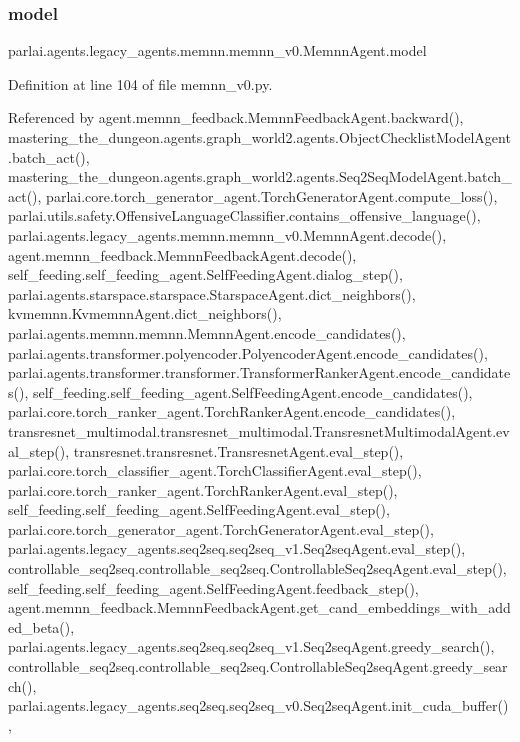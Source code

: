 \subsubsection{\texorpdfstring{model}{model}}
{\footnotesize\ttfamily parlai.\+agents.\+legacy\+\_\+agents.\+memnn.\+memnn\+\_\+v0.\+Memnn\+Agent.\+model}



Definition at line 104 of file memnn\+\_\+v0.\+py.



Referenced by agent.\+memnn\+\_\+feedback.\+Memnn\+Feedback\+Agent.\+backward(), mastering\+\_\+the\+\_\+dungeon.\+agents.\+graph\+\_\+world2.\+agents.\+Object\+Checklist\+Model\+Agent.\+batch\+\_\+act(), mastering\+\_\+the\+\_\+dungeon.\+agents.\+graph\+\_\+world2.\+agents.\+Seq2\+Seq\+Model\+Agent.\+batch\+\_\+act(), parlai.\+core.\+torch\+\_\+generator\+\_\+agent.\+Torch\+Generator\+Agent.\+compute\+\_\+loss(), parlai.\+utils.\+safety.\+Offensive\+Language\+Classifier.\+contains\+\_\+offensive\+\_\+language(), parlai.\+agents.\+legacy\+\_\+agents.\+memnn.\+memnn\+\_\+v0.\+Memnn\+Agent.\+decode(), agent.\+memnn\+\_\+feedback.\+Memnn\+Feedback\+Agent.\+decode(), self\+\_\+feeding.\+self\+\_\+feeding\+\_\+agent.\+Self\+Feeding\+Agent.\+dialog\+\_\+step(), parlai.\+agents.\+starspace.\+starspace.\+Starspace\+Agent.\+dict\+\_\+neighbors(), kvmemnn.\+Kvmemnn\+Agent.\+dict\+\_\+neighbors(), parlai.\+agents.\+memnn.\+memnn.\+Memnn\+Agent.\+encode\+\_\+candidates(), parlai.\+agents.\+transformer.\+polyencoder.\+Polyencoder\+Agent.\+encode\+\_\+candidates(), parlai.\+agents.\+transformer.\+transformer.\+Transformer\+Ranker\+Agent.\+encode\+\_\+candidates(), self\+\_\+feeding.\+self\+\_\+feeding\+\_\+agent.\+Self\+Feeding\+Agent.\+encode\+\_\+candidates(), parlai.\+core.\+torch\+\_\+ranker\+\_\+agent.\+Torch\+Ranker\+Agent.\+encode\+\_\+candidates(), transresnet\+\_\+multimodal.\+transresnet\+\_\+multimodal.\+Transresnet\+Multimodal\+Agent.\+eval\+\_\+step(), transresnet.\+transresnet.\+Transresnet\+Agent.\+eval\+\_\+step(), parlai.\+core.\+torch\+\_\+classifier\+\_\+agent.\+Torch\+Classifier\+Agent.\+eval\+\_\+step(), parlai.\+core.\+torch\+\_\+ranker\+\_\+agent.\+Torch\+Ranker\+Agent.\+eval\+\_\+step(), self\+\_\+feeding.\+self\+\_\+feeding\+\_\+agent.\+Self\+Feeding\+Agent.\+eval\+\_\+step(), parlai.\+core.\+torch\+\_\+generator\+\_\+agent.\+Torch\+Generator\+Agent.\+eval\+\_\+step(), parlai.\+agents.\+legacy\+\_\+agents.\+seq2seq.\+seq2seq\+\_\+v1.\+Seq2seq\+Agent.\+eval\+\_\+step(), controllable\+\_\+seq2seq.\+controllable\+\_\+seq2seq.\+Controllable\+Seq2seq\+Agent.\+eval\+\_\+step(), self\+\_\+feeding.\+self\+\_\+feeding\+\_\+agent.\+Self\+Feeding\+Agent.\+feedback\+\_\+step(), agent.\+memnn\+\_\+feedback.\+Memnn\+Feedback\+Agent.\+get\+\_\+cand\+\_\+embeddings\+\_\+with\+\_\+added\+\_\+beta(), parlai.\+agents.\+legacy\+\_\+agents.\+seq2seq.\+seq2seq\+\_\+v1.\+Seq2seq\+Agent.\+greedy\+\_\+search(), controllable\+\_\+seq2seq.\+controllable\+\_\+seq2seq.\+Controllable\+Seq2seq\+Agent.\+greedy\+\_\+search(), parlai.\+agents.\+legacy\+\_\+agents.\+seq2seq.\+seq2seq\+\_\+v0.\+Seq2seq\+Agent.\+init\+\_\+cuda\+\_\+buffer(), 